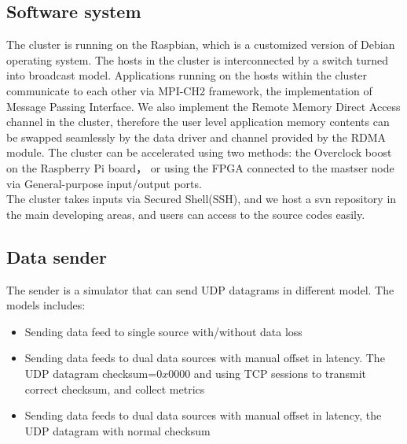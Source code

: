 \documentclass[11pt,openright,a4paper]{report}
\begin{document}
\subsection{Software system}
The cluster is running on the Raspbian, which is a customized version of Debian operating system. The hosts in the cluster is interconnected by a switch turned into broadcast model. Applications running on the hosts within the cluster communicate to each other via MPI-CH2 framework, the implementation of Message Passing Interface. We also implement the Remote Memory Direct Access channel in the cluster, therefore the user level application memory contents can be swapped seamlessly by the data driver and channel provided by the RDMA module. The cluster can be accelerated using two methods: the Overclock boost on the Raspberry Pi board\cite{upton2012meet}， or using the FPGA connected to the mastser node via General-purpose input/output ports. \\
The cluster takes inputs via Secured Shell(SSH), and we host a svn repository in the main developing areas, and users can access to the source codes easily.\\
\subsection{Data sender}
The sender is a simulator that can send UDP datagrams in different model. The models includes:
\begin{itemize}
	\item Sending data feed to single source with/without data loss
	\item Sending data feeds to dual data sources with manual offset in latency. The UDP datagram checksum=$0x0000$ and using TCP sessions to transmit correct checksum, and collect metrics
	\item Sending data feeds to dual data sources with manual offset in latency, the UDP datagram with normal checksum 
\end{itemize}
\end{document}
